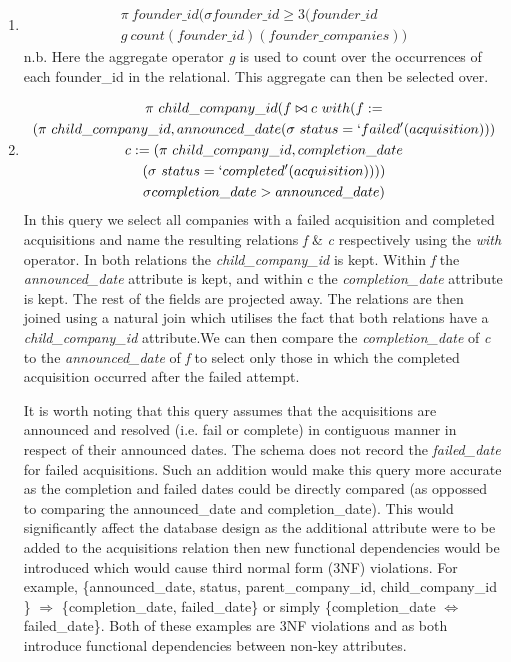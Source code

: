\documentclass[12pt]{article}
\begin{document}
\begin{enumerate}
  \item\label{part1}\begin{multline*} \pi \ founder\_id (\sigma founder\_id \geq 3 (founder\_id \ \\
  g \ count (founder\_id) (founder\_companies))
 \end{multline*}
 n.b. Here the aggregate operator \emph{g} is used to count over the occurrences of each founder\_id in the relational. This aggregate can then be selected over.
  \item\label{part1}\begin{multline*}
  \pi \ child\_company\_id (f \bowtie c \ with (f := \\
  (\pi \ child\_company\_id, announced\_date (\sigma \ status = `failed' (acquisition))) \\
  c := (\pi \ child\_company\_id, completion\_date \\
  (\sigma \ status = `completed' (acquisition)))
  ) \\
  \sigma completion\_date > announced\_date)
 \end{multline*}
 In this query we select all companies with a failed acquisition and completed acquisitions and name the resulting relations \emph{f} \& \emph{c} respectively using the \emph{with} operator. In both relations the \emph{child\_company\_id} is kept. Within \emph{f} the \emph{announced\_date} attribute is kept, and within {c} the \emph{completion\_date} attribute is kept. The rest of the fields are projected away. The relations are then joined using a natural join which utilises the fact that both relations have a \emph{child\_company\_id} attribute.We can then compare the \emph{completion\_date} of \emph{c} to the \emph{announced\_date} of \emph{f} to select only those in which the completed acquisition occurred after the failed attempt.

 It is worth noting that this query assumes that the acquisitions are announced and resolved (i.e. fail or complete) in contiguous manner in respect of their announced dates. The schema does not record the \emph {failed\_date} for failed acquisitions. Such an addition would make this query more accurate as the completion and failed dates could be directly compared (as oppossed to comparing the announced\_date and completion\_date).  This would significantly affect the database design as the additional attribute were to be added to the acquisitions relation then new functional dependencies would be introduced which would cause third normal form (3NF) violations. For example, \{{announced\_date, status, parent\_company\_id, child\_company\_id }\} $\Rightarrow$ \{{completion\_date, failed\_date}\} or simply \{{completion\_date $\Leftrightarrow$ failed\_date}\}. Both of these examples are 3NF violations and as both introduce functional dependencies between non-key attributes.


\end{enumerate}
\end{document}
